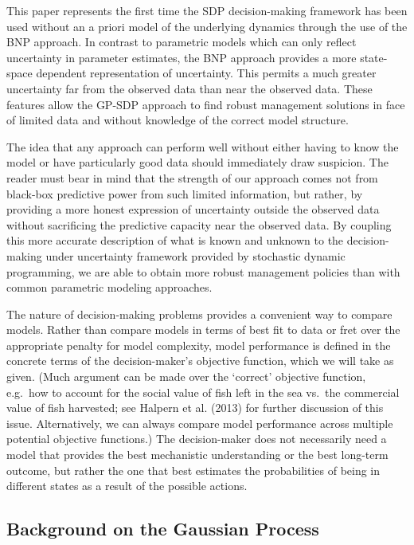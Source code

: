 \documentclass[author-year, review]{elsarticle} %
\begin{document}
This paper represents the first time the SDP decision-making framework
has been used without an a priori model of the underlying dynamics
through the use of the BNP approach. In contrast to parametric models
which can only reflect uncertainty in parameter estimates, the BNP
approach provides a more state-space dependent representation of
uncertainty. This permits a much greater uncertainty far from the
observed data than near the observed data. These features allow the
GP-SDP approach to find robust management solutions in face of limited
data and without knowledge of the correct model structure.

The idea that any approach can perform well without either having to
know the model or have particularly good data should immediately draw
suspicion. The reader must bear in mind that the strength of our
approach comes not from black-box predictive power from such limited
information, but rather, by providing a more honest expression of
uncertainty outside the observed data without sacrificing the predictive
capacity near the observed data. By coupling this more accurate
description of what is known and unknown to the decision-making under
uncertainty framework provided by stochastic dynamic programming, we are
able to obtain more robust management policies than with common
parametric modeling approaches.

The nature of decision-making problems provides a convenient way to
compare models. Rather than compare models in terms of best fit to data
or fret over the appropriate penalty for model complexity, model
performance is defined in the concrete terms of the decision-maker's
objective function, which we will take as given. (Much argument can be
made over the `correct' objective function, e.g.~how to account for the
social value of fish left in the sea vs.~the commercial value of fish
harvested; see Halpern et al. (2013) for further discussion of this
issue. Alternatively, we can always compare model performance across
multiple potential objective functions.) The decision-maker does not
necessarily need a model that provides the best mechanistic
understanding or the best long-term outcome, but rather the one that
best estimates the probabilities of being in different states as a
result of the possible actions.

\subsection{Background on the Gaussian
Process}\label{background-on-the-gaussian-process}
\end{document}
